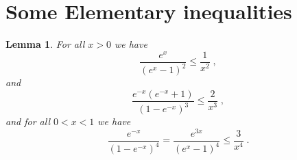 \documentclass[11pt]{article}
\theoremstyle{plain}
\newtheorem{lemma}[theorem]{Lemma}
\begin{document}
		
		


\appendix
\section{Some Elementary inequalities}

\begin{lemma}\label{lem:estimations}
For all $x>0$ we have
\begin{equation}\label{eq1}
    \frac{e^x}{(e^x-1)^2}\leq \frac{1}{x^2}\;,
\end{equation}
and
\begin{equation}\label{eq2}
    \frac{e^{-x}(e^{-x}+1)}{(1-e^{-x})^3}\leq \frac{2}{x^3}\;,
\end{equation}
and for all $0<x<1$ we have
\begin{equation}\label{eq4}
        \frac{e^{-x}}{(1-e^{-x})^4}=\frac{e^{3x}}{(e^x-1)^4}\leq \frac{3}{x^4}\;.
    \end{equation}
\end{lemma}
\end{document}
